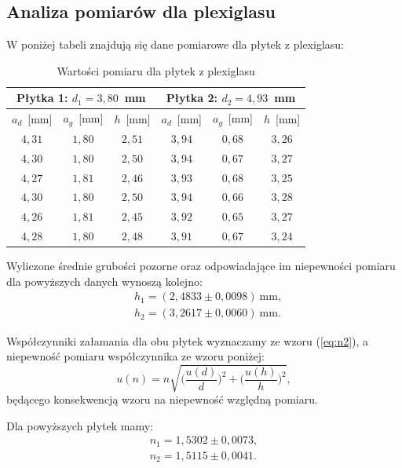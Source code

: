 \documentclass[12pt,a4paper]{article}
\numberwithin{equation}{section}
\begin{document}
\subsection{Analiza pomiarów dla plexiglasu}

W poniżej tabeli znajdują się dane pomiarowe dla płytek z plexiglasu:

\begin{table}[!ht]
	\caption{Wartości pomiaru dla płytek z plexiglasu}
	\centering
	\begin{tabular}{c|c|c||c|c|c}
		\hline \multicolumn{3}{c||}{Płytka 1: $d_1 = 3,80$~mm} & \multicolumn{3}{c}{Płytka 2: $d_2 = 4,93$~mm} \\ \hline 
		$a_d$~[mm] & $a_g$~[mm] & $h$~[mm] &  $a_d$~[mm] & $a_g$~[mm] & $h$~[mm] \\ \hline \hline
		$4,31$ & $1,80$ & $2,51$ & $3,94$ & $0,68$ & $3,26$\\
		$4,30$ & $1,80$ & $2,50$ & $3,94$ & $0,67$ & $3,27$\\
		$4,27$ & $1,81$ & $2,46$ & $3,93$ & $0,68$ & $3,25$\\
		$4,30$ & $1,80$ & $2,50$ & $3,94$ & $0,66$ & $3,28$\\
		$4,26$ & $1,81$ & $2,45$ & $3,92$ & $0,65$ & $3,27$\\
		$4,28$ & $1,80$ & $2,48$ & $3,91$ & $0,67$ & $3,24$\\ \hline
	\end{tabular}
	\label{tab:tab1}
\end{table}

Wyliczone średnie grubości pozorne oraz odpowiadające im niepewności pomiaru dla powyższych danych wynoszą kolejno:
\begin{equation}
	\begin{split}
		& h_1 = (2,4833 \pm 0,0098)~\textrm{mm}, \\
		& h_2 = (3,2617 \pm 0,0060)~\textrm{mm}.
	\end{split}
\end{equation}

Współczynniki załamania dla obu płytek wyznaczamy ze wzoru (\ref{eq:n2}), a niepewność pomiaru współczynnika ze wzoru poniżej:
\begin{equation}
	u(n) = n \sqrt{\Bigg(\frac{u(d)}{d}\Bigg)^2 + \Bigg(\frac{u(h)}{h}\Bigg)^2},
	\label{eq:un}
\end{equation}
będącego konsekwencją wzoru na niepewność względną pomiaru.

Dla powyższych płytek mamy:
\begin{equation}
	\begin{split}
		n_1 = 1,5302 \pm 0,0073, \\
		n_2 = 1,5115 \pm 0,0041.
	\end{split}
\end{equation}
\end{document}
